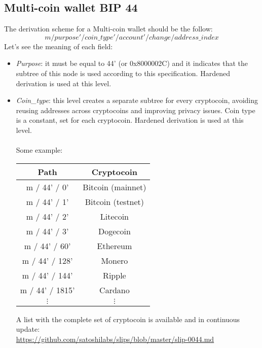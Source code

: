 \subsection{Multi-coin wallet BIP 44}
The derivation scheme for a Multi-coin wallet should be the follow:
\begin{equation*}
m / purpose' / coin\_type' / account' / change / address\_index
\end{equation*}
Let's see the meaning of each field:
\begin{itemize}
	\item \textit{Purpose}: it must be equal to 44' (or 0x8000002C)  and it indicates that the subtree of this node is used according to this specification. Hardened derivation is used at this level.
	\item \textit{Coin\_type}: this level creates a separate subtree for every cryptocoin, avoiding reusing addresses across cryptocoins and improving privacy issues. Coin type is a constant, set for each cryptocoin. Hardened derivation is used at this level.
	\\ \\
	Some example:
	\begin{center}
		\begin{tabular}{|| c | c ||} 
			\hline
			Path & Cryptocoin  \\ [0.5ex] 
			\hline\hline
			m / 44' / 0' & Bitcoin (mainnet) \\ 
			m / 44' / 1' & Bitcoin (testnet) \\			
			m / 44' / 2' & Litecoin \\			
			m / 44' / 3' & Dogecoin \\			
			m / 44' / 60' & Ethereum  \\ 
			m / 44' / 128' & Monero  \\
			m / 44' / 144' & Ripple  \\ 
			m / 44' / 1815' & Cardano  \\  
			$\vdots $& $\vdots $  \\ 
			\hline
		\end{tabular}
	\end{center}
	A list with the complete set of cryptocoin is available and in continuous update: \\ \url{https://github.com/satoshilabs/slips/blob/master/slip-0044.md }
	

\end{itemize}
